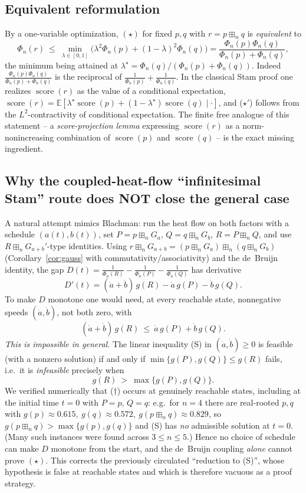 \documentclass[12pt]{article}
\theoremstyle{remark}
\DeclareMathOperator{\score}{score}
\newcommand{\boxp}{\boxplus_n}
\begin{document}
\subsection*{Equivalent reformulation}
By a one-variable optimization, $(\star)$ for fixed $p,q$ with $r=p\boxp q$ is
\emph{equivalent} to
\[
\Phi_n(r)\ \le\ \min_{\lambda\in[0,1]}
\big(\lambda^2\Phi_n(p)+(1-\lambda)^2\Phi_n(q)\big)
=\frac{\Phi_n(p)\Phi_n(q)}{\Phi_n(p)+\Phi_n(q)} ,
\tag{$\star'$}
\]
the minimum being attained at $\lambda^\star=\Phi_n(q)/(\Phi_n(p)+\Phi_n(q))$.
Indeed $\frac{\Phi_n(p)\Phi_n(q)}{\Phi_n(p)+\Phi_n(q)}$ is the reciprocal of
$\frac1{\Phi_n(p)}+\frac1{\Phi_n(q)}$.  In the classical Stam proof one
realizes $\score(r)$ as the value of a conditional expectation,
$\score(r)=\mathbb E[\lambda^\star\score(p)+(1-\lambda^\star)\score(q)\mid\cdot]$,
and ($\star'$) follows from the $L^2$-contractivity of conditional expectation.
The finite free analogue of this statement -- a \emph{score-projection lemma}
expressing $\score(r)$ as a norm-nonincreasing combination of $\score(p)$ and
$\score(q)$ -- is the exact missing ingredient.

\subsection*{Why the coupled-heat-flow ``infinitesimal Stam'' route does NOT
close the general case}
A natural attempt mimics Blachman: run the heat flow on both factors with a
schedule $(a(t),b(t))$, set $P=p\boxp G_a$, $Q=q\boxp G_b$, $R=P\boxp Q$, and
use $R\boxp G_{a+b}'$-type identities.  Using
$r\boxp G_{a+b}=(p\boxp G_a)\boxp(q\boxp G_b)$ (Corollary~\ref{cor:gauss}
with commutativity/associativity) and the de~Bruijn identity, the gap
$D(t)=\frac1{\Phi_n(R)}-\frac1{\Phi_n(P)}-\frac1{\Phi_n(Q)}$ has derivative
\[
D'(t)=(\dot a+\dot b)\,g(R)-\dot a\,g(P)-\dot b\,g(Q). \tag{D}
\]
To make $D$ monotone one would need, at every reachable state, nonnegative
speeds $(\dot a,\dot b)$, not both zero, with
\[
(\dot a+\dot b)\,g(R)\ \le\ \dot a\,g(P)+\dot b\,g(Q). \tag{S}
\]
\emph{This is impossible in general.}  The linear inequality (S) in
$(\dot a,\dot b)\ge0$ is feasible (with a nonzero solution) if and only if
$\min\{g(P),g(Q)\}\le g(R)$ fails, i.e.\ it is \emph{infeasible} precisely when
\[
g(R)\ >\ \max\{g(P),g(Q)\}. \tag{$\dagger$}
\]
We verified numerically that ($\dagger$) occurs at genuinely reachable states,
including at the initial time $t=0$ with $P=p$, $Q=q$: e.g.\ for $n=4$ there are
real-rooted $p,q$ with
$g(p)\approx0.615,\ g(q)\approx0.572,\ g(p\boxp q)\approx0.829$,
so $g(p\boxp q)>\max\{g(p),g(q)\}$ and (S) has \emph{no} admissible solution at
$t=0$.  (Many such instances were found across $3\le n\le5$.)  Hence no choice
of schedule can make $D$ monotone from the start, and the de~Bruijn coupling
\emph{alone} cannot prove $(\star)$.  This corrects the previously circulated
``reduction to (S)'', whose hypothesis is false at reachable states and which
is therefore vacuous as a proof strategy.
\end{document}
